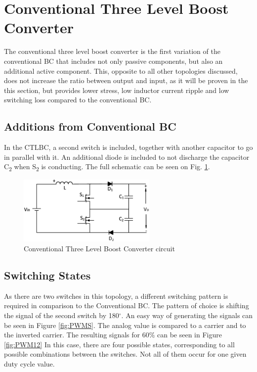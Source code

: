 \section{Conventional Three Level Boost Converter}\label{ch:TLBC}

The conventional three level boost converter is the first variation of the conventional BC that includes not only passive components, but also an additional active component. 
This, opposite to all other topologies discussed, does not increase the ratio between output and input, as it will be proven in the this section, but provides lower stress, low inductor current ripple and low switching loss compared to the conventional BC. \cite{Tran2017}

\subsection{Additions from Conventional BC}
In the CTLBC, a second switch is included, together with another capacitor to go in parallel with it. 
An additional diode is included to not discharge the capacitor C\textsubscript{2} when S\textsubscript{2} is conducting.
The full schematic can be seen on Fig. \ref{fig:CTLBC}.  

\begin{figure} [H]
   \centering
   \includegraphics[width=0.6\textwidth]{figures/dConventionalThreeLevelBC/Three_level.pdf}
    \caption{Conventional Three Level Boost Converter circuit}
	\label{fig:CTLBC}
\end{figure}
\subsection{Switching States}

As there are two switches in this topology, a different switching pattern is required in comparison to the Conventional BC. The pattern of choice is shifting the signal of the second switch by 180$^\circ$.
An easy way of generating the signals can be seen in Figure \ref{fig:PWMS}. The analog value is compared to a carrier and to the inverted carrier. The resulting signals for 60\% can be seen in Figure \ref{fig:PWM12}
In this case, there are four possible states, corresponding to all possible combinations between the switches. Not all of them occur for one given duty cycle value. 

